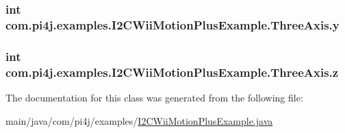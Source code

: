 \subsubsection[{y}]{\setlength{\rightskip}{0pt plus 5cm}int com.\+pi4j.\+examples.\+I2\+C\+Wii\+Motion\+Plus\+Example.\+Three\+Axis.\+y}\label{classcom_1_1pi4j_1_1examples_1_1I2CWiiMotionPlusExample_1_1ThreeAxis_a271c8a23d3b08a697207aeabbb4fc523}
\hypertarget{classcom_1_1pi4j_1_1examples_1_1I2CWiiMotionPlusExample_1_1ThreeAxis_a49d88e91188af7cc75cb642be222ebd9}{}
\subsubsection[{z}]{\setlength{\rightskip}{0pt plus 5cm}int com.\+pi4j.\+examples.\+I2\+C\+Wii\+Motion\+Plus\+Example.\+Three\+Axis.\+z}\label{classcom_1_1pi4j_1_1examples_1_1I2CWiiMotionPlusExample_1_1ThreeAxis_a49d88e91188af7cc75cb642be222ebd9}


The documentation for this class was generated from the following file\+:\begin{DoxyCompactItemize}
\item 
main/java/com/pi4j/examples/\hyperlink{I2CWiiMotionPlusExample_8java}{I2\+C\+Wii\+Motion\+Plus\+Example.\+java}\end{DoxyCompactItemize}
